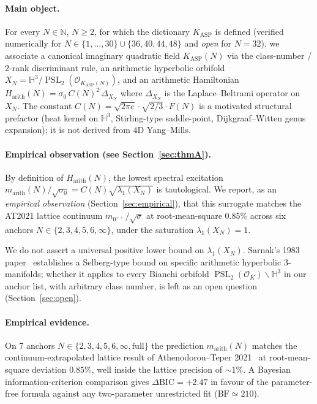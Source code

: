 \documentclass[11pt,a4paper]{article}
\theoremstyle{definition}
\DeclareMathOperator{\PSL}{PSL}
\newcommand{\KASP}{K_{\mathrm{ASP}}}
\newcommand{\Harith}{H_{\mathrm{arith}}}
\newcommand{\marith}{m_{\mathrm{arith}}}
\newcommand{\HH}{\mathbb{H}}
\newcommand{\NN}{\mathbb{N}}
\newcommand{\OK}{\mathcal{O}_K}
\begin{document}
\paragraph{Main object.} For every $N \in \NN$, $N \geq 2$, for which the
dictionary $\KASP$ is defined (verified numerically for
$N\in\{1,\dots,30\}\cup\{36,40,44,48\}$ and \emph{open} for $N=32$), we
associate a canonical imaginary quadratic field $\KASP(N)$ via the
class-number / 2-rank discriminant rule, an arithmetic hyperbolic orbifold
$X_N = \HH^3/\PSL_2(\mathcal{O}_{\KASP(N)})$, and an arithmetic Hamiltonian
$\Harith(N) = \sigma_0\,C(N)^2\,\Delta_{X_N}$ where $\Delta_{X_N}$ is the
Laplace--Beltrami operator on $X_N$. The constant
$C(N) = \sqrt{2\pi e}\cdot\sqrt{2/3}\cdot F(N)$ is a motivated structural
prefactor (heat kernel on $\HH^3$, Stirling-type saddle-point, Dijkgraaf--Witten
genus expansion); it is not derived from $4$D Yang--Mills.

\paragraph{Empirical observation (see Section~\ref{sec:thmA}).}
By definition of $\Harith(N)$, the lowest spectral excitation
$\marith(N)/\sqrt{\sigma_0} = C(N)\sqrt{\lambda_1(X_N)}$ is tautological.
We report, as an \emph{empirical observation} (Section~\ref{sec:empirical}),
that this surrogate matches the AT2021 lattice continuum
$m_{0^{++}}/\sqrt{\sigma}$ at root-mean-square $0.85\%$ across six anchors
$N\in\{2,3,4,5,6,\infty\}$, under the saturation $\lambda_1(X_N)=1$.

We do not assert a universal positive lower bound on $\lambda_1(X_N)$. Sarnak's
1983 paper~\cite{Sarnak1983} establishes a Selberg-type bound on specific
arithmetic hyperbolic 3-manifolds; whether it applies to every Bianchi orbifold
$\PSL_2(\OK)\backslash\HH^3$ in our anchor list, with arbitrary class number, is
left as an open question (Section~\ref{sec:open}).

\paragraph{Empirical evidence.} On 7 anchors $N \in \{2,3,4,5,6,\infty,\text{full}\}$
the prediction $\marith(N)$ matches the continuum-extrapolated lattice
result of Athenodorou--Teper 2021~\cite{AT2021} at root-mean-square deviation
$0.85\%$, well inside the lattice precision of $\sim 1\%$. A Bayesian
information-criterion comparison gives $\Delta\text{BIC} = +2.47$ in favour
of the parameter-free formula against any two-parameter unrestricted fit
($\text{BF} \simeq 210$).
\end{document}
